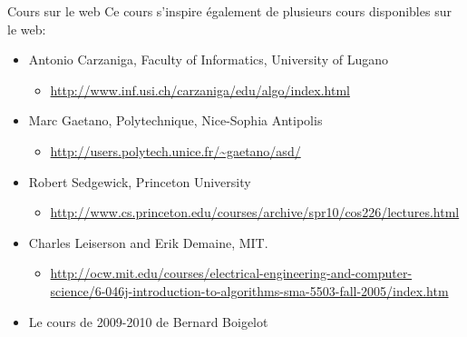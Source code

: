 \begin{frame}{Cours sur le web}
Ce cours s'inspire également de plusieurs cours disponibles sur le web:
\begin{itemize}
\item Antonio Carzaniga, Faculty of Informatics, University of Lugano
\begin{itemize}
\item \url{http://www.inf.usi.ch/carzaniga/edu/algo/index.html}
\end{itemize}
\item Marc Gaetano, Polytechnique, Nice-Sophia Antipolis
\begin{itemize}
\item \url{http://users.polytech.unice.fr/~gaetano/asd/}
\end{itemize}
\item Robert Sedgewick, Princeton University
\begin{itemize}
\item \url{http://www.cs.princeton.edu/courses/archive/spr10/cos226/lectures.html}
\end{itemize}
\item Charles Leiserson and Erik Demaine, MIT.
\begin{itemize}
\item \url{http://ocw.mit.edu/courses/electrical-engineering-and-computer-science/6-046j-introduction-to-algorithms-sma-5503-fall-2005/index.htm}
\end{itemize}
\item Le cours de 2009-2010 de Bernard Boigelot
\end{itemize}
\end{frame}
